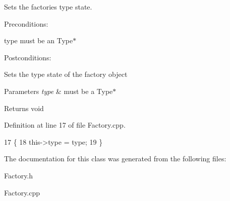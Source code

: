 Sets the factories type state. 

Preconditions\+:
\begin{DoxyItemize}
\item type must be an Type$\ast$
\end{DoxyItemize}

Postconditions\+:
\begin{DoxyItemize}
\item Sets the type state of the factory object
\end{DoxyItemize}


\begin{DoxyParams}{Parameters}
{\em type} & must be a Type$\ast$ \\
\hline
\end{DoxyParams}
\begin{DoxyReturn}{Returns}
void 
\end{DoxyReturn}


Definition at line 17 of file Factory.\+cpp.


\begin{DoxyCode}
17                                 \{
18     this->type = type;
19 \}
\end{DoxyCode}


The documentation for this class was generated from the following files\+:\begin{DoxyCompactItemize}
\item 
Factory.\+h\item 
Factory.\+cpp\end{DoxyCompactItemize}
